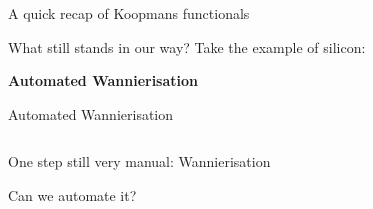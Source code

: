 \documentclass[xcolor=table,aspectratio=169]{beamer}
\numberwithin{equation}{section}
\begin{document}
\begin{frame}{A quick recap of Koopmans functionals}

   What still stands in our way? Take the example of silicon:


\end{frame}

\begin{frame}{}
   \begin{center}
      \Huge \bf Automated Wannierisation
   \end{center}
\end{frame}

% 
\begin{frame}{Automated Wannierisation}

   \begin{columns}
      \begin{column}{0.5\textwidth}
         One step still very manual: Wannierisation

         Can we automate it?


\end{column}
\end{columns}
\end{frame}
\end{document}
